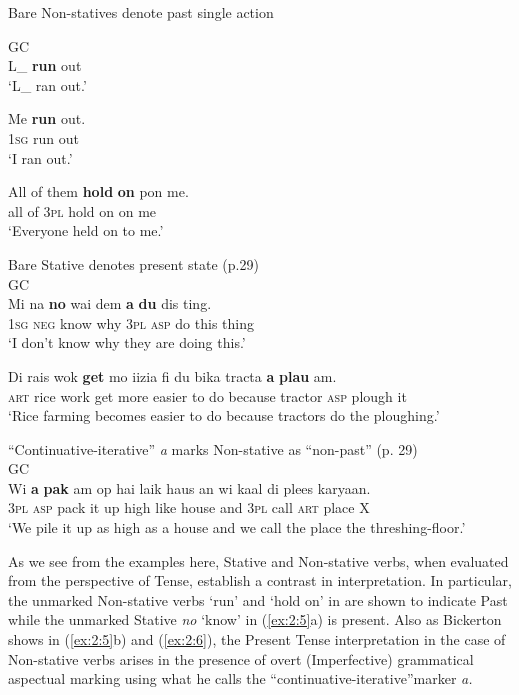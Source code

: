 \ea\label{ex:2:4}Bare Non-statives denote past single action \citep[29]{Bickerton1975}

\ea
GC\\
L\_ \textbf{run} out\\
\glt `L\_ ran out.'

\ex
\gll Me  \textbf{run} out.\\
\textsc{1sg} run out\\
\glt `I ran out.'

\ex All of    them \textbf{hold} \textbf{on} pon me.\\
    all of    \textsc{3pl}  hold on on me\\
\glt `Everyone held on to me.' \z \z

\ea\label{ex:2:5}
{Bare Stative denotes present state (p.29)}\\
GC  \\
\ea
\gll Mi na \textbf{no} wai dem \textbf{a} \textbf{du} dis ting.\\
        \textsc{1sg}  \textsc{neg} know why \textsc{3pl} \textsc{asp} do this thing\\
\glt `I don’t know why they are doing this.'

\ex
\gll Di       rais wok \textbf{get} mo     iizia      fi du bika           tracta  \textbf{a}        \textbf{plau}  am.\\
\textsc{art} rice work get more easier to do because tractor \textsc{asp}   plough   it\\
\glt `Rice farming becomes easier to do because tractors do the ploughing.'
\z
\z

\ea\label{ex:2:6} ``Continuative-iterative'' \textit{a} marks
Non-stative as ``non-past'' {(p. 29)}\\
GC\\
\gll  Wi                      \textbf{a}      \textbf{pak} am op hai     laik  haus     an      wi  kaal di   plees karyaan.\\
\textsc{3pl} \textsc{asp} pack    it   up high like house and \textsc{3pl} call \textsc{art} place X\\
\glt `We pile it up as high as a house and we call the place the threshing-floor.' \z

As we see from the examples here, Stative and Non-stative verbs, when
evaluated from the perspective of Tense, establish a contrast in
interpretation.  In particular, the unmarked Non-stative verbs `run'
and `hold on' in  are shown to indicate Past while the
unmarked Stative \textit{no} `know' in (\ref{ex:2:5}a) is present.
Also as Bickerton shows in (\ref{ex:2:5}b) and (\ref{ex:2:6}), the
Present Tense interpretation in the case of Non-stative verbs arises
in the presence of overt (Imperfective) grammatical aspectual marking
using what he calls the “continuative-iterative”marker \textit{a.}

